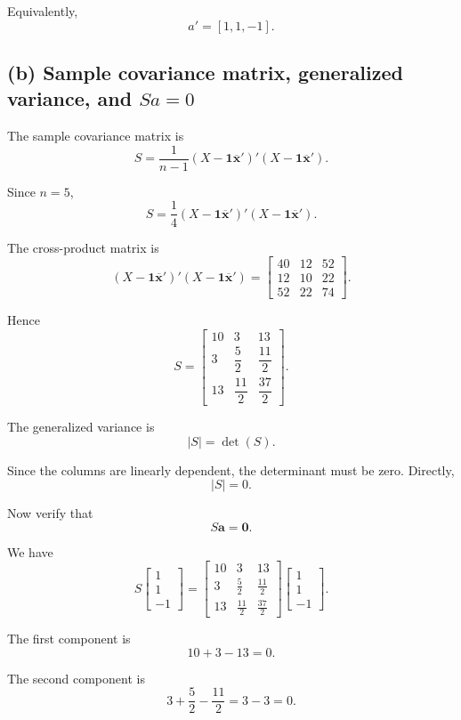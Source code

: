 \documentclass[12pt,a4paper]{article}
\newcommand{\one}{\mathbf{1}}
\begin{document}
Equivalently,
\[
\boxed{a'=[1,1,-1]}.
\]

\subsection*{(b) Sample covariance matrix, generalized variance, and \(Sa=0\)}

The sample covariance matrix is
\[
S
=
\frac{1}{n-1}
(X-\one\overline{\mathbf{x}}')'
(X-\one\overline{\mathbf{x}}').
\]

Since \(n=5\),
\[
S
=
\frac14
(X-\one\overline{\mathbf{x}}')'
(X-\one\overline{\mathbf{x}}').
\]

The cross-product matrix is
\[
(X-\one\overline{\mathbf{x}}')'
(X-\one\overline{\mathbf{x}}')
=
\begin{bmatrix}
40&12&52\\
12&10&22\\
52&22&74
\end{bmatrix}.
\]

Hence
\[
\boxed{
S=
\begin{bmatrix}
10&3&13\\
3&\dfrac52&\dfrac{11}{2}\\
13&\dfrac{11}{2}&\dfrac{37}{2}
\end{bmatrix}}.
\]

The generalized variance is
\[
|S|=\det(S).
\]

Since the columns are linearly dependent, the determinant must be zero. Directly,
\[
\boxed{|S|=0}.
\]

Now verify that
\[
S\mathbf{a}=\mathbf{0}.
\]

We have
\[
S
\begin{bmatrix}
1\\1\\-1
\end{bmatrix}
=
\begin{bmatrix}
10&3&13\\
3&\frac52&\frac{11}{2}\\
13&\frac{11}{2}&\frac{37}{2}
\end{bmatrix}
\begin{bmatrix}
1\\1\\-1
\end{bmatrix}.
\]

The first component is
\[
10+3-13=0.
\]

The second component is
\[
3+\frac52-\frac{11}{2}
=
3-\!3
=
0.
\]
\end{document}
